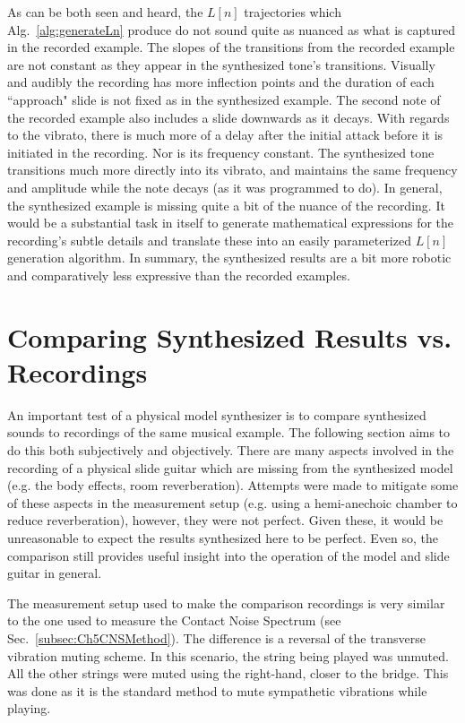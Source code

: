 \documentclass[../main.tex]{subfiles}
\begin{document}
As can be both seen and heard, the $L[n]$ trajectories which Alg.~\ref{alg:generateLn} produce do not sound quite as nuanced as what is captured in the recorded example. The slopes of the transitions from the recorded example are not constant as they appear in the synthesized tone's transitions. Visually and audibly the recording has more inflection points and the duration of each ``approach" slide is not fixed as in the synthesized example. The second note of the recorded example also includes a slide downwards as it decays. With regards to the vibrato, there is much more of a delay after the initial attack before it is initiated in the recording. Nor is its frequency constant. The synthesized tone transitions much more directly into its vibrato, and maintains the same frequency and amplitude while the note decays (as it was programmed to do). In general, the synthesized example is missing quite a bit of the nuance of the recording. It would be a substantial task in itself to generate mathematical expressions for the recording's subtle details and translate these into an easily parameterized $L[n]$ generation algorithm. In summary, the synthesized results are a bit more robotic and comparatively less expressive than the recorded examples.

\section{Comparing Synthesized Results vs. Recordings}
An important test of a physical model synthesizer is to compare synthesized sounds to recordings of the same musical example. The following section aims to do this both subjectively and objectively. There are many aspects involved in the recording of a physical slide guitar which are missing from the synthesized model (e.g. the body effects, room reverberation). Attempts were made to mitigate some of these aspects in the measurement setup (e.g. using a hemi-anechoic chamber to reduce reverberation), however, they were not perfect. Given these, it would be unreasonable to expect the results synthesized here to be perfect. Even so, the comparison still provides useful insight into the operation of the model and slide guitar in general.

The measurement setup used to make the comparison recordings is very similar to the one used to measure the Contact Noise Spectrum (see Sec.~\ref{subsec:Ch5CNSMethod}). The difference is a reversal of the transverse vibration muting scheme. In this scenario, the string being played was unmuted. All the other strings were muted using the right-hand, closer to the bridge. This was done as it is the standard method to mute sympathetic vibrations while playing.
\end{document}
